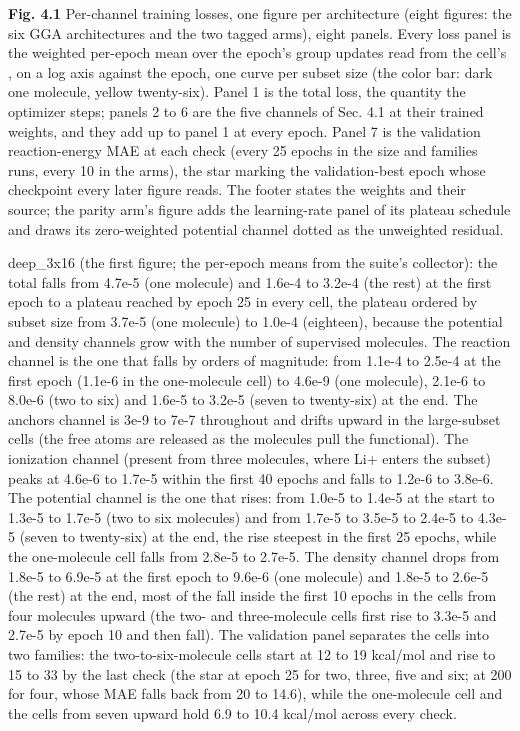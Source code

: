 \documentclass[10pt,a4paper]{article}
\begin{document}
\textbf{Fig. 4.1} Per-channel training losses, one figure per architecture (eight figures: the six GGA architectures and the two tagged arms), eight panels. Every loss panel is the weighted per-epoch mean over the epoch's group updates read from the cell's , on a log axis against the epoch, one curve per subset size (the color bar: dark one molecule, yellow twenty-six). Panel 1 is the total loss, the quantity the optimizer steps; panels 2 to 6 are the five channels of Sec. 4.1 at their trained weights, and they add up to panel 1 at every epoch. Panel 7 is the validation reaction-energy MAE at each check (every 25 epochs in the size and families runs, every 10 in the arms), the star marking the validation-best epoch whose checkpoint every later figure reads. The footer states the weights and their source; the parity arm's figure adds the learning-rate panel of its plateau schedule and draws its zero-weighted potential channel dotted as the unweighted residual.

deep\_3x16 (the first figure; the per-epoch means from the suite's collector): the total falls from 4.7e-5 (one molecule) and 1.6e-4 to 3.2e-4 (the rest) at the first epoch to a plateau reached by epoch 25 in every cell, the plateau ordered by subset size from 3.7e-5 (one molecule) to 1.0e-4 (eighteen), because the potential and density channels grow with the number of supervised molecules. The reaction channel is the one that falls by orders of magnitude: from 1.1e-4 to 2.5e-4 at the first epoch (1.1e-6 in the one-molecule cell) to 4.6e-9 (one molecule), 2.1e-6 to 8.0e-6 (two to six) and 1.6e-5 to 3.2e-5 (seven to twenty-six) at the end. The anchors channel is 3e-9 to 7e-7 throughout and drifts upward in the large-subset cells (the free atoms are released as the molecules pull the functional). The ionization channel (present from three molecules, where Li+ enters the subset) peaks at 4.6e-6 to 1.7e-5 within the first 40 epochs and falls to 1.2e-6 to 3.8e-6. The potential channel is the one that rises: from 1.0e-5 to 1.4e-5 at the start to 1.3e-5 to 1.7e-5 (two to six molecules) and from 1.7e-5 to 3.5e-5 to 2.4e-5 to 4.3e-5 (seven to twenty-six) at the end, the rise steepest in the first 25 epochs, while the one-molecule cell falls from 2.8e-5 to 2.7e-5. The density channel drops from 1.8e-5 to 6.9e-5 at the first epoch to 9.6e-6 (one molecule) and 1.8e-5 to 2.6e-5 (the rest) at the end, most of the fall inside the first 10 epochs in the cells from four molecules upward (the two- and three-molecule cells first rise to 3.3e-5 and 2.7e-5 by epoch 10 and then fall). The validation panel separates the cells into two families: the two-to-six-molecule cells start at 12 to 19 kcal/mol and rise to 15 to 33 by the last check (the star at epoch 25 for two, three, five and six; at 200 for four, whose MAE falls back from 20 to 14.6), while the one-molecule cell and the cells from seven upward hold 6.9 to 10.4 kcal/mol across every check.
\end{document}
